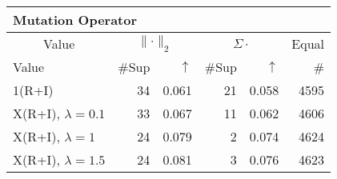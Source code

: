 \begin{center}
\renewcommand{\tabcolsep}{4pt}
\renewcommand{\arraystretch}{1.1}
\begin{customnormal}
\begin{tabular}{lrrrrr}
\multicolumn{6}{l}{Mutation Operator}\\
\toprule
\multicolumn{1}{c}{Value} & \multicolumn{2}{c}{$\lVert \cdot \rVert_2$} & \multicolumn{2}{c}{$\Sigma \cdot$} & \multicolumn{1}{c}{Equal} \\ 
\cmidrule(lr){1-1} \cmidrule(lr){2-3} \cmidrule(lr){4-5}  \cmidrule(lr){6-6}
Value & \#Sup & $\uparrow$ & \#Sup & $\uparrow$ & \# \\ 
\midrule
1(R+I) & 34 & 0.061 & 21 & 0.058 & 4595 \\ 
X(R+I), $\lambda=0.1$ & 33 & 0.067 & 11 & 0.062 & 4606 \\ 
X(R+I), $\lambda=1$ & 24 & 0.079 & 2 & 0.074 & 4624 \\ 
X(R+I), $\lambda=1.5$ & 24 & 0.081 & 3 & 0.076 & 4623 \\ 
\bottomrule
\end{tabular}


\end{customnormal}
\end{center}
